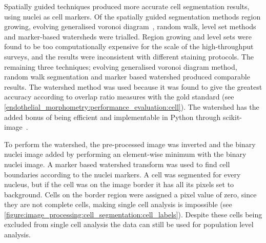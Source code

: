 Spatially guided techniques produced more accurate cell segmentation results, using nuclei as cell markers. Of the spatially guided segmentation methods region growing, evolving generalised voronoi diagram~\cite{Yu2010}, random walk, level set methods and marker-based watersheds were trialled. Region growing and level sets were found to be too computationally expensive for the scale of the high-throughput surveys, and the results were inconsistent with different staining protocols. The remaining three techniques; evolving generalised voronoi diagram method, random walk segmentation and marker based watershed produced comparable results. The watershed method was used because it was found to give the greatest accuracy according to overlap ratio measures with the gold standard (see \autoref{endothelial_morphometry:performance_evaluation:cell}). The watershed has the added bonus of being efficient and implementable in Python through scikit-image~\cite{VanderWalt2014}.

To perform the watershed, the pre-processed image was inverted and the binary nuclei image added by performing an element-wise minimum with the binary nuclei image. A marker based watershed transform was used to find cell boundaries according to the nuclei markers. A cell was segmented for every nucleus, but if the cell was on the image border it has all its pixels set to background. Cells on the border region were assigned a pixel value of zero, since they are not complete cells, making single cell analysis is impossible (see \autoref{figure:image_processing:cell_segmentation:cell_labels}). Despite these cells being excluded from single cell analysis the data can still be used for population level analysis.

